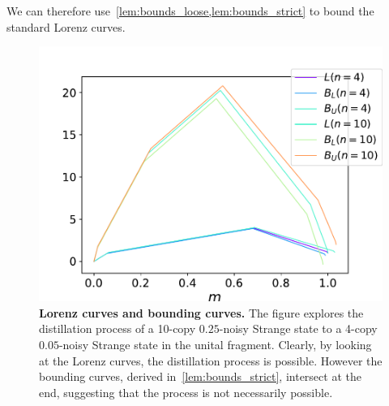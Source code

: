 We can therefore use~\cref{lem:bounds_loose,lem:bounds_strict} to bound the standard Lorenz curves.
\begin{figure}[b]
    \centering
    \includegraphics[scale=0.4]{figs/lc_bounds.pdf}
    \caption{\textbf{Lorenz curves and bounding curves.} 
    The figure explores the distillation process of a 10-copy $0.25$-noisy Strange state to a 4-copy $0.05$-noisy Strange state in the unital fragment.
    Clearly, by looking at the Lorenz curves, the distillation process is possible.
    However the bounding curves, derived in~\cref{lem:bounds_strict}, intersect at the end, suggesting that the process is not necessarily possible.
    }
    \label{fig:lc_bounds}
\end{figure}
\fi %

